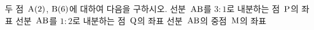 두 점~$\mathrm{A}(2)$, $\mathrm{B}(6)$에 대하여 다음을 구하시오.
 선분~$\mathrm{AB}$를 $3:1$로 내분하는 점~$\mathrm{P}$의 좌표
 선분~$\mathrm{AB}$를 $1:2$로 내분하는 점~$\mathrm{Q}$의 좌표
 선분~$\mathrm{AB}$의 중점~$\mathrm{M}$의 좌표
